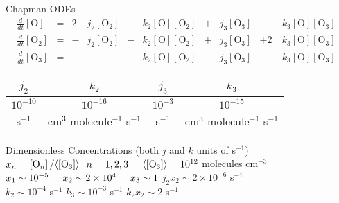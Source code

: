 \vspace{-0.25in}
\begin{block}{Chapman ODEs}
\vspace{-0.15in}
\begin{align*}
\frac{d}{dt} \left[ \mathrm{O} \right]
&=&
2 \ &j_2 \left[ \mathrm{O_2} \right]&
- &k_2 \left[ \mathrm{O} \right] \left[ \mathrm{O_2} \right]&
+ &j_3 \left[ \mathrm{O_3} \right]&
- &k_3 \left[ \mathrm{O} \right] \left[ \mathrm{O_3} \right]&
\\
\frac{d}{dt} \left[ \mathrm{O_2} \right]
&=&
- &j_2 \left[ \mathrm{O_2} \right]&
- &k_2 \left[ \mathrm{O} \right] \left[ \mathrm{O_2} \right]&
+ &j_3 \left[ \mathrm{O_3} \right]&
+ 2 \ &k_3 \left[ \mathrm{O} \right] \left[ \mathrm{O_3} \right]&
\\
\frac{d}{dt} \left[ \mathrm{O_3} \right]
&=&
& &
  &k_2 \left[ \mathrm{O} \right] \left[ \mathrm{O_2} \right]&
- &j_3 \left[ \mathrm{O_3} \right]&
- &k_3 \left[ \mathrm{O} \right] \left[ \mathrm{O_3} \right]&
\end{align*}
\end{block}
\vspace{0.05in}
\begin{tabular}{|c|c|c|c|}
\hline
$j_2$ & $k_2$ & $j_3$ & $k_3$ \\
\hline
$10^{-10}$ & $10^{-16}$ & $10^{-3}$ & $10^{-15}$ \\
s$^{-1}$ & cm$^3$ molecule$^{-1}$ s$^{-1}$
& s$^{-1}$ & cm$^3$ molecule$^{-1}$ s$^{-1}$ \\
\hline
\end{tabular}
\vspace{-0.05in}
\begin{exampleblock}{Dimensionless Concentrations
\hspace{0.2in} (both $j$ and $k$ units of s$^{-1}$)}
\vspace{0.05in}
$x_n = \left[ \mathrm{O}_n \right] /
\langle \left[ \mathrm{O_3} \right] \rangle
\hspace{0.1in} n = 1, 2, 3
\hspace{0.2in} \langle \left[ \mathrm{O_3} \right] \rangle
= 10^{12}$
molecules cm$^{-3}$ \\
$x_1 \sim 10^{-5} \hspace{0.2in}
x_2 \sim 2 \times 10^4 \hspace{0.2in} x_3 \sim 1$
\hspace{0.2in} $j_2 x_2 \sim 2 \times 10^{-6}$ s$^{-1}$
\\
$k_2 \sim 10^{-4}$ s$^{-1}$
\hspace{0.1in} $k_3 \sim 10^{-3}$ s$^{-1}$
\hspace{0.1in} $k_2 x_2 \sim 2$ s$^{-1}$
\end{exampleblock}

